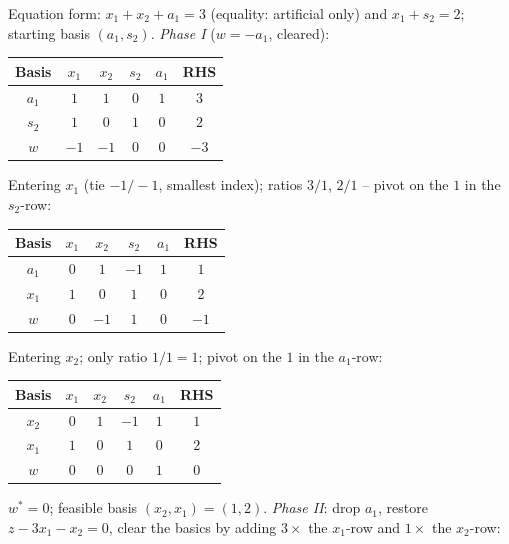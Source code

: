 \begin{solutions}
  \item Equation form: $x_{1}+x_{2}+a_{1}=3$ (equality: artificial only)
        and $x_{1}+s_{2}=2$; starting basis $(a_{1},s_{2})$.
        \emph{Phase I} ($w=-a_{1}$, cleared):
        \begin{center}
        \begin{tabular}{c|cccc|c}
        Basis & $x_{1}$ & $x_{2}$ & $s_{2}$ & $a_{1}$ & RHS\\
        \hline
        $a_{1}$ & $1$ & $1$ & $0$ & $1$ & $3$\\
        $s_{2}$ & $1$ & $0$ & $1$ & $0$ & $2$\\
        \hline
        $w$ & $-1$ & $-1$ & $0$ & $0$ & $-3$\\
        \end{tabular}
        \end{center}
        Entering $x_{1}$ (tie $-1/-1$, smallest index); ratios $3/1$,
        $2/1$ -- pivot on the $1$ in the $s_{2}$-row:
        \begin{center}
        \begin{tabular}{c|cccc|c}
        Basis & $x_{1}$ & $x_{2}$ & $s_{2}$ & $a_{1}$ & RHS\\
        \hline
        $a_{1}$ & $0$ & $1$ & $-1$ & $1$ & $1$\\
        $x_{1}$ & $1$ & $0$ & $1$ & $0$ & $2$\\
        \hline
        $w$ & $0$ & $-1$ & $1$ & $0$ & $-1$\\
        \end{tabular}
        \end{center}
        Entering $x_{2}$; only ratio $1/1=1$; pivot on the $1$ in the
        $a_{1}$-row:
        \begin{center}
        \begin{tabular}{c|cccc|c}
        Basis & $x_{1}$ & $x_{2}$ & $s_{2}$ & $a_{1}$ & RHS\\
        \hline
        $x_{2}$ & $0$ & $1$ & $-1$ & $1$ & $1$\\
        $x_{1}$ & $1$ & $0$ & $1$ & $0$ & $2$\\
        \hline
        $w$ & $0$ & $0$ & $0$ & $1$ & $0$\\
        \end{tabular}
        \end{center}
        $w^{*}=0$; feasible basis $(x_{2},x_{1})=(1,2)$. \emph{Phase II}:
        drop $a_{1}$, restore $z-3x_{1}-x_{2}=0$, clear the basics by
        adding $3\times$ the $x_{1}$-row and $1\times$ the $x_{2}$-row:

\end{solutions}
